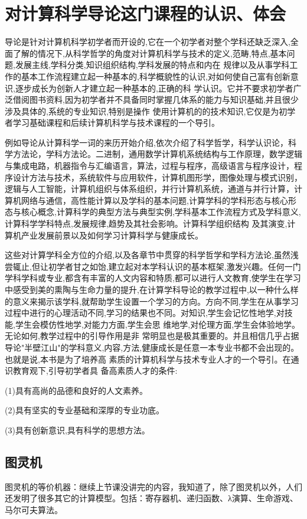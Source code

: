 \documentclass{article}
\begin{document}
\section{对计算科学导论这门课程的认识、体会}
导论是针对计算机科学初学者而开设的,它在一个初学者对整个学科还缺乏深入,全面了解的情况下,从科学哲学的角度对计算机科学与技术的定义,范畴,特点,基本问题,发展主线,学科分类,知识组织结构,学科发展的特点和内在 规律以及从事学科工作的基本工作流程建立起一种基本的,科学概貌性的认识,对如何使自己富有创新意识,逐步成长为创新人才建立起一种基本的,正确的科 学认识。它并不要求初学者广泛借阅图书资料,因为初学者并不具备同时掌握几体系的能力与知识基础,并且很少涉及具体的,系统的专业知识,特别是操作 使用计算机的的技术知识,它仅是为初学者学习基础课程和后续计算机科学与技术课程的一个导引。\par
例如导论从计算科学一词的来历开始介绍,依次介绍了科学哲学，科学认识论，科学方法论，学科方法论。二进制，通用数学计算机系统结构与工作原理，数学逻辑与集成电路，机器指令与汇编语言，算法，过程与程序，高级语言与程序设计，程序设计方法与技术，系统软件与应用软件，计算机图形学，图像处理与模式识别，逻辑与人工智能，计算机组织与体系组织，并行计算机系统，通道与并行计算，计算机网络与通信，高性能计算以及学科的基本问题,计算学科的学科形态与核心形态与核心概念,计算科学的典型方法与典型实例,学科基本工作流程方式及学科意义,计算科学学科特点,发展规律,趋势及其社会影响。计算科学组织结构 及其演变,计算机产业发展前景以及如何学习计算科学与健康成长。\par
这些对计算学科全方位的介绍,以及各章节中贯穿的科学哲学和学科方法论,虽然浅尝辄止,但让初学者甘之如饴,建立起对本学科认识的基本框架,激发兴趣。任何一门学科学科或专业,都含有丰富的人文内容和特质,都可以进行人文教育,使学生在学习中感受到美的熏陶与生命力量的提升,在计算学科导论的教学过程中,以一种什么样的意义来揭示该学科,就帮助学生设置一个学习的方向。方向不同,学生在从事学习过程中进行的心理活动不同,学习的结果也不同。对知识,学生会记忆性地学,对技能,学生会模仿性地学,对能力方面,学生会思 维地学,对伦理方面,学生会体验地学。无论如何,教学过程中的引导作用是非 常明显也是极其重要的。并且相信几乎占据导论"半壁江山"的学科意义,内容,方法,健康成长是任意一本专业书都不会出现的。也就是说,本书是为了培养高 素质的计算机科学与技术专业人才的一个导引。在通识教育观下,引导初学者具 备高素质人才的条件: \par
(1)具有高尚的品德和良好的人文素养。\par
(2)具有坚实的专业基础和深厚的专业功底。\par
(3)具有创新意识,具有科学的思想方法。\par
\subsection{图灵机}
图灵机的等价机器：继续上节课没讲完的内容，我知道了，除了图灵机以外，人们还发明了很多其它的计算模型。包括：寄存器机、递归函数、λ演算、生命游戏、马尔可夫算法。\par
\end{document}
